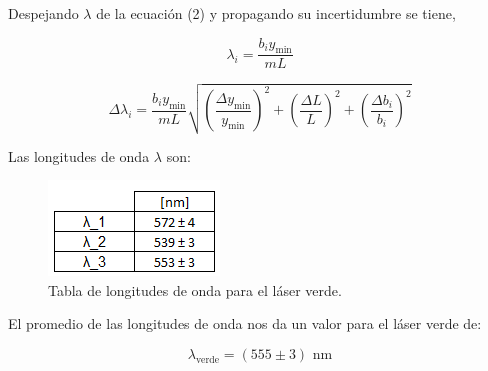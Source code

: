 \documentclass[DIV=calc, paper=a4, fontsize=10.5pt]{scrartcl}
\begin{document}
Despejando $\lambda$ de la ecuación (2) y propagando su incertidumbre se tiene,

\begin{equation*}
    \lambda_i = \frac{b_i y_{\text{min}}}{mL}
\end{equation*}

\begin{equation*}
    \Delta \lambda_i = \frac{b_i y_{\text{min}}}{mL} \sqrt{\left(\frac{\Delta y_{\text{min}}}{y_{\text{min}}}\right)^{2} + \left(\frac{\Delta L}{L}\right)^{2} + \left(\frac{\Delta b_i}{b_i}\right)^{2}}
\end{equation*}

Las longitudes de onda $\lambda$ son:

\begin{figure}[H]
    \centering
    \includegraphics{tablas/tabla 4.PNG}
    \caption{Tabla de longitudes de onda para el láser verde.}
    \label{fig:my_label}
\end{figure}

El promedio de las longitudes de onda nos da un valor para el láser verde de:

\begin{equation*}
    \lambda_{\text{verde}} = (555 \pm 3) \text{ nm}
\end{equation*}
\end{document}

